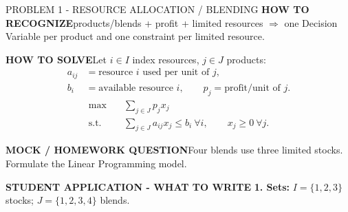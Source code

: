 \documentclass[10pt,landscape]{article}
\newcommand{\recognize}{\textbf{HOW TO RECOGNIZE}\quad}
\newcommand{\procedure}{\textbf{HOW TO SOLVE}\quad}
\newcommand{\question}{\textbf{MOCK / HOMEWORK QUESTION}\quad}
\newcommand{\example}{\textbf{STUDENT APPLICATION - WHAT TO WRITE}\quad}
\begin{document}
\begin{minipage}[t]{0.327\textwidth}\vspace{0pt}
\begin{blk}{PROBLEM 1 - RESOURCE ALLOCATION / BLENDING}
\recognize products/blends + profit + limited resources $\Rightarrow$ one Decision Variable per product and one constraint per limited resource.

\procedure Let $i\in I$ index resources, $j\in J$ products:
\[
\begin{aligned}
a_{ij}&=\text{resource }i\text{ used per unit of }j,\\
b_i&=\text{available resource }i,\qquad p_j=\text{profit/unit of }j.
\end{aligned}
\]
\[
\boxed{\begin{aligned}
\max\quad&\sum_{j\in J}p_jx_j\\
\text{s.t.}\quad&\sum_{j\in J}a_{ij}x_j\le b_i\ \forall i,\qquad x_j\ge0\ \forall j.
\end{aligned}}
\]

\question Four blends use three limited stocks. Formulate the Linear Programming model.

\example
\textbf{1. Sets:} $I=\{1,2,3\}$ stocks; $J=\{1,2,3,4\}$ blends.


\end{blk}
\end{minipage}
\end{document}
